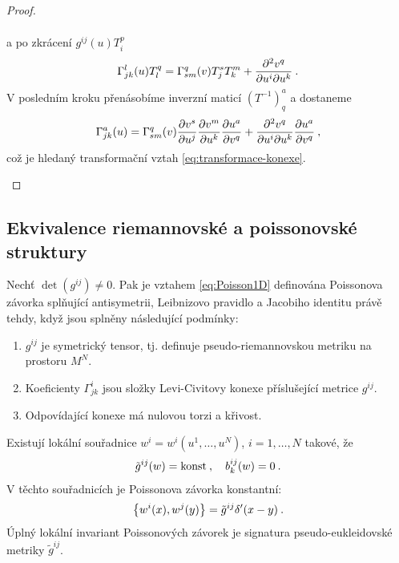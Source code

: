 \begin{proof}
\begin{enumerate}
\begin{align}
        \end{align}
        a po zkrácení $g^{ij}(u) T^p_i$
        \begin{align}
            \Gamma^l_{jk}(u) T^q_l = \Gamma^q_{sm}(v) T^s_j T^m_k + \frac{\partial^2 v^q}{\partial u^i \partial u^k} \:.
        \end{align}
        V posledním kroku přenásobíme inverzní maticí $(T^{-1})^a_q$ a dostaneme
        \begin{align}
            \Gamma^a_{jk}(u) = \Gamma^q_{sm}(v) \frac{\partial v^s}{\partial u^j} \frac{\partial v^m}{\partial u^k} \frac{\partial u^a}{\partial v^q} + \frac{\partial^2 v^q}{\partial u^i \partial u^k} \frac{\partial u^a}{\partial v^q} \:,
        \end{align}
        což je hledaný transformační vztah \eqref{eq:transformace-konexe}.
    \end{enumerate}
\end{proof}

\subsection{Ekvivalence riemannovské a poissonovské struktury}



\begin{theorem} \label{theorem1:ekvivalence}
    Nechť $\det(g^{ij}) \neq 0$. Pak je vztahem \eqref{eq:Poisson1D} definována Poissonova závorka splňující antisymetrii, Leibnizovo pravidlo a Jacobiho identitu právě tehdy, když jsou splněny následující podmínky:
    \begin{enumerate}
        \item $g^{ij}$ je symetrický tensor, tj. definuje pseudo-riemannovskou metriku na prostoru $M^N$.
        \item Koeficienty $\Gamma^{i}_{jk}$ jsou složky Levi-Civitovy konexe příslušející metrice $g^{ij}$.
        \item Odpovídající konexe má nulovou torzi a křivost.
    \end{enumerate}
\end{theorem}

\begin{corollary}
    Existují lokální souřadnice $w^i = w^i(u^1, \dots, u^N)$, $i = 1, \dots, N$ takové, že
    \begin{align}
        \tilde g^{ij}(w) = \mathrm{konst} \:, \quad b^{ij}_k (w) = 0 \:.
    \end{align}
    V těchto souřadnicích je Poissonova závorka konstantní:
    \begin{align}
        \left \lbrace w^i(x),w^j(y) \right \rbrace = \tilde{g}^{ij} \delta'(x-y) \:.
    \end{align}
    Úplný lokální invariant Poissonových závorek je signatura pseudo-eukleidovské metriky $\tilde g^{ij}$.
\end{corollary}

